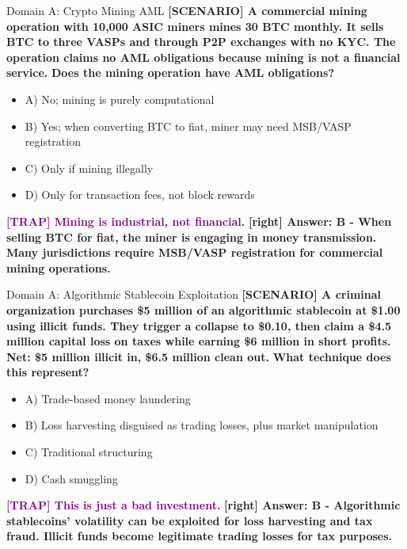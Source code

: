 \documentclass[11pt,a4paper]{beamer}
\newcommand{\trap}[1]{\textcolor{purple}{\textbf{[TRAP] #1}}}
\newcommand{\correct}[1]{\textcolor{green!50!black}{\textbf{[right] #1}}}
\newcommand{\scenario}[1]{\textcolor{blue!70!black}{\textbf{[SCENARIO] #1}}}
\begin{document}
\begin{frame}{Domain A: Crypto Mining AML}
\scenario{A commercial mining operation with 10,000 ASIC miners mines 30 BTC monthly. It sells BTC to three VASPs and through P2P exchanges with no KYC. The operation claims no AML obligations because mining is not a financial service.}
\vspace{0.2cm}
\textbf{Does the mining operation have AML obligations?}
\vspace{0.2cm}
\begin{itemize}
    \item A) No; mining is purely computational
    \item B) Yes; when converting BTC to fiat, miner may need MSB/VASP registration
    \item C) Only if mining illegally
    \item D) Only for transaction fees, not block rewards
\end{itemize}
\vspace{0.2cm}
\trap{Mining is industrial, not financial.}
\correct{Answer: B - When selling BTC for fiat, the miner is engaging in money transmission. Many jurisdictions require MSB/VASP registration for commercial mining operations.}
\end{frame}

\begin{frame}{Domain A: Algorithmic Stablecoin Exploitation}
\scenario{A criminal organization purchases \$5 million of an algorithmic stablecoin at \$1.00 using illicit funds. They trigger a collapse to \$0.10, then claim a \$4.5 million capital loss on taxes while earning \$6 million in short profits. Net: \$5 million illicit in, \$6.5 million clean out.}
\vspace{0.2cm}
\textbf{What technique does this represent?}
\vspace{0.2cm}
\begin{itemize}
    \item A) Trade-based money laundering
    \item B) Loss harvesting disguised as trading losses, plus market manipulation
    \item C) Traditional structuring
    \item D) Cash smuggling
\end{itemize}
\vspace{0.2cm}
\trap{This is just a bad investment.}
\correct{Answer: B - Algorithmic stablecoins' volatility can be exploited for loss harvesting and tax fraud. Illicit funds become legitimate trading losses for tax purposes.}
\end{frame}
\end{document}
